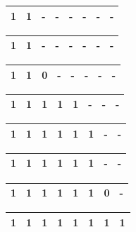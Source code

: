 \documentclass[12pt]{article}
\begin{document}
\begin{table}[h!]
\begin{tabular}{|l|l|l|l|l|l|l|l|}
\hline
1 & 1 & - & - & - & - & - & - \\ \hline
\end{tabular}
\end{table}

\begin{table}[h!]
\begin{tabular}{|l|l|l|l|l|l|l|l|}
\hline
1 & 1 & - & - & - & - & - & - \\ \hline
\end{tabular}
\end{table}

\begin{table}[h!]
\begin{tabular}{|l|l|l|l|l|l|l|l|}
\hline
1 & 1 & 0 & - & - & - & - & - \\ \hline
\end{tabular}
\end{table}

\begin{table}[h!]
\begin{tabular}{|l|l|l|l|l|l|l|l|}
\hline
1 & 1 & 1 & 1 & 1 & - & - & - \\ \hline
\end{tabular}
\end{table}

\begin{table}[h!]
\begin{tabular}{|l|l|l|l|l|l|l|l|}
\hline
1 & 1 & 1 & 1 & 1 & 1 & - & - \\ \hline
\end{tabular}
\end{table}

\begin{table}[h!]
\begin{tabular}{|l|l|l|l|l|l|l|l|}
\hline
1 & 1 & 1 & 1 & 1 & 1 & - & - \\ \hline
\end{tabular}
\end{table}

\begin{table}[h!]
\begin{tabular}{|l|l|l|l|l|l|l|l|}
\hline
1 & 1 & 1 & 1 & 1 & 1 & 0 & - \\ \hline
\end{tabular}
\end{table}

\begin{table}[h!]
\begin{tabular}{|l|l|l|l|l|l|l|l|}
\hline
1 & 1 & 1 & 1 & 1 & 1 & 1 & 1 \\ \hline
\end{tabular}
\end{table}
\end{document}
